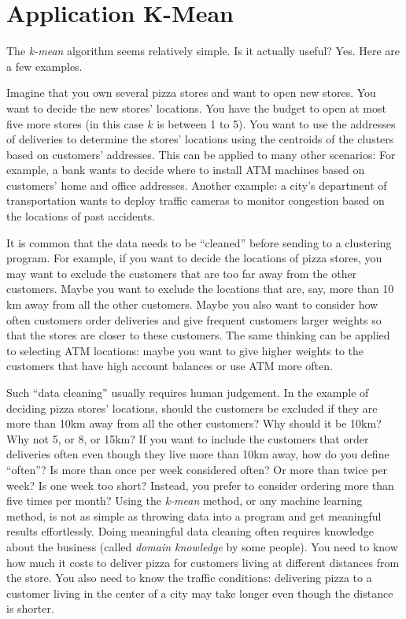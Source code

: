 
\section{Application K-Mean}

The {\it k-mean} algorithm seems relatively simple. Is it actually useful?
Yes. Here are a few examples.

Imagine that you own several pizza stores and want to open new stores.
You want to decide the new stores' locations.  You have the budget to
open at most five more stores (in this case $k$ is between 1 to 5).
You want to use the addresses of deliveries to determine the stores'
locations using the centroids of the clusters based on customers'
addresses.  This can be applied to many other scenarios: For example,
a bank wants to decide where to install ATM machines based on
customers' home and office addresses.  Another example: a city's
department of transportation wants to deploy traffic cameras to
monitor congestion based on the locations of past accidents.


It is common that the data needs to be ``cleaned'' before sending to a
clustering program.  For example, if you want to decide the locations
of pizza stores, you may want to exclude the customers that are too
far away from the other customers. Maybe you want to exclude the
locations that are, say, more than 10 km away from all the other
customers.  Maybe you also want to consider how often customers order
deliveries and give frequent customers larger weights so that the
stores are closer to these customers.  The same thinking can be
applied to selecting ATM locations: maybe you want to give higher
weights to the customers that have high account balances or use ATM
more often.

Such ``data cleaning'' usually requires human judgement. In the
example of deciding pizza stores' locations, should the customers be
excluded if they are more than 10km away from all the other customers?
Why should it be 10km? Why not 5, or 8, or 15km?  If you want to
include the customers that order deliveries often even though they
live more than 10km away, how do you define ``often''?  Is more than
once per week considered often? Or more than twice per week?  Is one
week too short? Instead, you prefer to consider ordering more than
five times per month?  Using the {\it k-mean} method, or any machine
learning method, is not as simple as throwing data into a program and
get meaningful results effortlessly.  Doing meaningful data cleaning
often requires knowledge about the business (called {\it domain
  knowledge} by some people). You need to know how much it costs to
deliver pizza for customers living at different distances from the
store. You also need to know the traffic conditions: delivering pizza
to a customer living in the center of a city may take longer even
though the distance is shorter.



